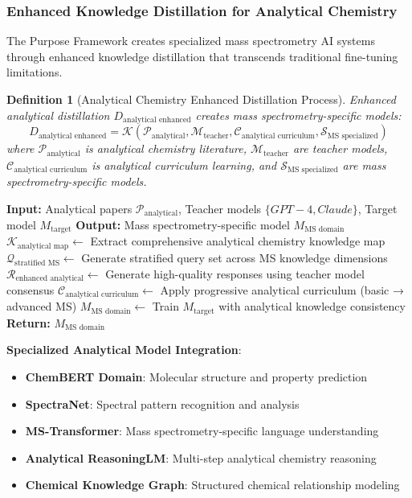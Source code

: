 \documentclass[11pt,a4paper]{article}
\newtheorem{definition}[theorem]{Definition}
\theoremstyle{remark}
\begin{document}
\subsubsection{Enhanced Knowledge Distillation for Analytical Chemistry}

The Purpose Framework creates specialized mass spectrometry AI systems through enhanced knowledge distillation that transcends traditional fine-tuning limitations.

\begin{definition}[Analytical Chemistry Enhanced Distillation Process]
Enhanced analytical distillation $D_{\text{analytical enhanced}}$ creates mass spectrometry-specific models:
\begin{equation}
D_{\text{analytical enhanced}} = \mathcal{K}(\mathcal{P}_{\text{analytical}}, \mathcal{M}_{\text{teacher}}, \mathcal{C}_{\text{analytical curriculum}}, \mathcal{S}_{\text{MS specialized}})
\end{equation}
where $\mathcal{P}_{\text{analytical}}$ is analytical chemistry literature, $\mathcal{M}_{\text{teacher}}$ are teacher models, $\mathcal{C}_{\text{analytical curriculum}}$ is analytical curriculum learning, and $\mathcal{S}_{\text{MS specialized}}$ are mass spectrometry-specific models.
\end{definition}

\begin{algorithm}[H]
\caption{Purpose Framework Distillation for Mass Spectrometry}
\begin{algorithmic}[1]
\State \textbf{Input:} Analytical papers $\mathcal{P}_{\text{analytical}}$, Teacher models $\{GPT-4, Claude\}$, Target model $M_{\text{target}}$
\State \textbf{Output:} Mass spectrometry-specific model $M_{\text{MS domain}}$
\State $\mathcal{K}_{\text{analytical map}} \leftarrow$ Extract comprehensive analytical chemistry knowledge map
\State $\mathcal{Q}_{\text{stratified MS}} \leftarrow$ Generate stratified query set across MS knowledge dimensions
\State $\mathcal{R}_{\text{enhanced analytical}} \leftarrow$ Generate high-quality responses using teacher model consensus
\State $\mathcal{C}_{\text{analytical curriculum}} \leftarrow$ Apply progressive analytical curriculum (basic → advanced MS)
\State $M_{\text{MS domain}} \leftarrow$ Train $M_{\text{target}}$ with analytical knowledge consistency
\State \textbf{Return:} $M_{\text{MS domain}}$
\end{algorithmic}
\end{algorithm}

\textbf{Specialized Analytical Model Integration}:
\begin{itemize}
\item \textbf{ChemBERT Domain}: Molecular structure and property prediction
\item \textbf{SpectraNet}: Spectral pattern recognition and analysis
\item \textbf{MS-Transformer}: Mass spectrometry-specific language understanding
\item \textbf{Analytical ReasoningLM}: Multi-step analytical chemistry reasoning
\item \textbf{Chemical Knowledge Graph}: Structured chemical relationship modeling
\end{itemize}
\end{document}
